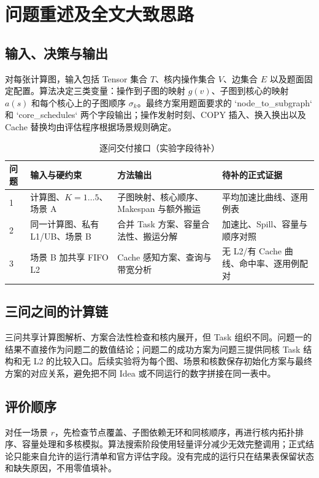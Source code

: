 \section{问题重述及全文大致思路}
\subsection{输入、决策与输出}
对每张计算图，输入包括 Tensor 集合 $T$、核内操作集合 $V$、边集合 $E$ 以及题面固定配置。算法决定三类变量：操作到子图的映射 $g(v)$、子图到核心的映射 $a(s)$ 和每个核心上的子图顺序 $\sigma_k$。最终方案用题面要求的 `node\_to\_subgraph` 和 `core\_schedules` 两个字段输出；操作发射时刻、COPY 插入、换入换出以及 Cache 替换均由评估程序根据场景规则确定。

\begin{table}[H]\centering\caption{逐问交付接口（实验字段待补）}
\begin{tabularx}{\linewidth}{lYYY}\toprule
问题 & 输入与硬约束 & 方法输出 & 待补的正式证据\\ & 计算图、$K=1\ldots5$、场景 A & 子图映射、核心顺序、Makespan 与额外搬运 & 平均加速比曲线、逐用例表\\
2 & 同一计算图、私有 L1/UB、场景 B & 合并 Task 方案、容量合法性、搬运分解 & 加速比、Spill、容量与顺序对照\\
3 & 场景 B 加共享 FIFO L2 & Cache 感知方案、查询与带宽分析 & 无 L2/有 Cache 曲线、命中率、逐用例配对\\\bottomrule
\end{tabularx}\end{table}

\subsection{三问之间的计算链}
三问共享计算图解析、方案合法性检查和核内展开，但 Task 组织不同。问题一的结果不直接作为问题二的数值结论；问题二的成功方案为问题三提供同核 Task 结构和无 L2 的比较入口。后续实验将为每个图、场景和核数保存初始化方案与最终方案的对应关系，避免把不同 Idea 或不同运行的数字拼接在同一表中。


\subsection{评价顺序}
对任一场景 $r$，先检查节点覆盖、子图依赖无环和同核顺序，再进行核内拓扑排序、容量处理和多核模拟。算法搜索阶段使用轻量评分减少无效完整调用；正式结论只能来自允许的运行清单和官方评估字段。没有完成的运行只在结果表保留状态和缺失原因，不用零值填补。
